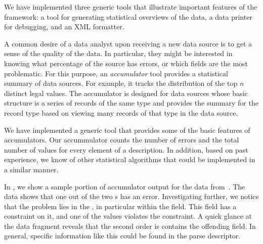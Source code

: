 We have implemented three generic tools that illustrate important
features of the framework: a tool for generating statistical
overviews of the data, a data printer for debugging, and an XML
formatter.

A common desire of a data analyst upon receiving a new data source is
to get a sense of the quality of the data. In particular, they might
be interested in knowing what percentage of the source has errors, or
which fields are the most problematic. For this purpose, an
\emph{accumulator} tool provides a statistical summary of data
sources. For example, it tracks the distribution of the top $n$
distinct legal values. The accumulator is designed for data sources
whose basic structure is a series of records of the same type and
provides the summary for the record type based on viewing many records
of that type in the data source.

We have implemented a generic tool that provides some of the basic
features of accumulators. Our accummulator counts the number of errors
and the total number of values for every element of a description. In
addition, based on past experience, we know of other statistical
algorithms that could be implemented in a similar manner.

In , we show a sample portion of
accumulator output for the \dibbler{} data
from~. The data shows that one out of the
two s has an error. Investigating further, we notice that the
problem lies in the , in particular within the
 field.  This field has a constraint on it, and one
of the values violates the constraint. A quick glance at the data
fragment reveals that the second order is contains the offending
field. In general, specific information like this could be found in
the parse descriptor.

